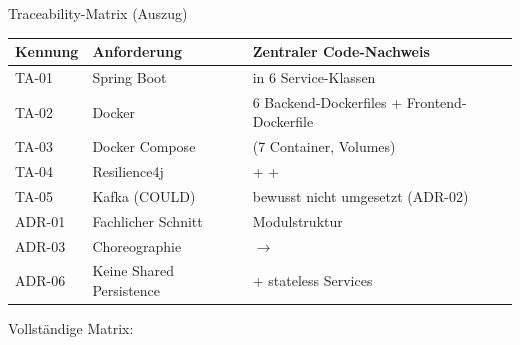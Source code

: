 \begin{frame}{Traceability-Matrix (Auszug)}
  \small
  \begin{tabularx}{\textwidth}{L{1.6cm}L{4.6cm}Y}
    \toprule
    \textbf{Kennung} & \textbf{Anforderung} & \textbf{Zentraler Code-Nachweis} \\
    \midrule
    TA-01 & Spring Boot &  in 6 Service-Klassen \\
    TA-02 & Docker & 6 Backend-Dockerfiles + Frontend-Dockerfile \\
    TA-03 & Docker Compose &  (7 Container, Volumes) \\
    TA-04 & Resilience4j &  +  +  \\
    TA-05 & Kafka (COULD) & bewusst nicht umgesetzt (ADR-02) \\
    \midrule
    ADR-01 & Fachlicher Schnitt & Modulstruktur  \\
    ADR-03 & Choreographie &  $\rightarrow$  \\
    ADR-06 & Keine Shared Persistence &  + stateless Services \\
    \bottomrule
  \end{tabularx}

  \vfill
  \begin{center}
    \small\color{codegray}
    Vollständige Matrix: 
  \end{center}
\end{frame}
